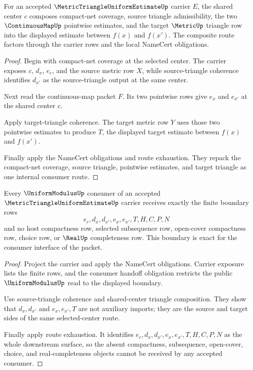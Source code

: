 \begin{theorem}
\label{thm:metric-triangle-uniform-estimate-shared-center-triangle-composition}
For an accepted $\MetricTriangleUniformEstimateUp$ carrier $E$, the shared center $c$ composes compact-net coverage, source triangle admissibility, the two $\ContinuousMapUp$ pointwise estimates, and the target $\MetricUp$ triangle row into the displayed estimate between $f(x)$ and $f(x')$. The composite route factors through the carrier rows and the local NameCert obligations.
\end{theorem}
\begin{proof}
Begin with compact-net coverage at the selected center. The carrier exposes $c$, $d_x$, $e_c$, and the source metric row $X$, while source-triangle coherence identifies $d_{x'}$ as the source-triangle output at the same center.

Next read the continuous-map packet $F$. Its two pointwise rows give $e_x$ and $e_{x'}$ at the shared center $c$.

Apply target-triangle coherence. The target metric row $Y$ uses those two pointwise estimates to produce $T$, the displayed target estimate between $f(x)$ and $f(x')$.

Finally apply the NameCert obligations and route exhaustion. They repack the compact-net coverage, source triangle, pointwise estimates, and target triangle as one internal consumer route.
\end{proof}

\begin{theorem}
\label{thm:metric-triangle-uniform-estimate-uniformmodulus-boundary-exactness}
Every $\UniformModulusUp$ consumer of an accepted $\MetricTriangleUniformEstimateUp$ carrier receives exactly the finite boundary rows
$$
e_c,d_x,d_{x'},e_x,e_{x'},T,H,C,P,N
$$
and no host compactness row, selected subsequence row, open-cover compactness row, choice row, or $\RealUp$ completeness row. This boundary is exact for the consumer interface of the packet.
\end{theorem}
\begin{proof}
Project the carrier and apply the NameCert obligations. Carrier exposure lists the finite rows, and the consumer handoff obligation restricts the public $\UniformModulusUp$ read to the displayed boundary.

Use source-triangle coherence and shared-center triangle composition. They show that $d_x,d_{x'}$ and $e_x,e_{x'},T$ are not auxiliary imports; they are the source and target sides of the same selected-center route.

Finally apply route exhaustion. It identifies $e_c,d_x,d_{x'},e_x,e_{x'},T,H,C,P,N$ as the whole downstream surface, so the absent compactness, subsequence, open-cover, choice, and real-completeness objects cannot be received by any accepted consumer.
\end{proof}

